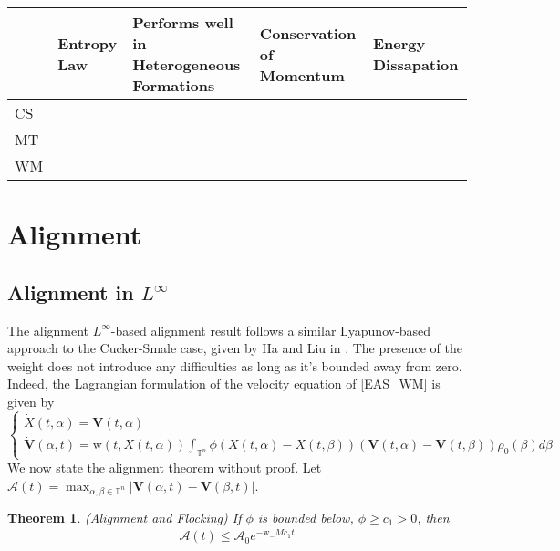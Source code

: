 \documentclass[11pt,letterpaper]{amsart}
\theoremstyle{plain}
\newtheorem{theorem}[THEOREM]{Theorem}
\theoremstyle{definition}
\theoremstyle{remark}
\newcommand{\T}{\ensuremath{\mathbb{T}}}   %
\def \cA {\mathcal{A}}
\renewcommand{\geq}{\geqslant}
\renewcommand{\leq}{\leqslant}
\newcommand{\cmark}{\ding{51}}%
\newcommand{\xmark}{\ding{55}}%
\def\T{\mathbb{T}}
\def\V{\textbf{V}}
\def \wt {\mathrm{w}}
\begin{document}
\medskip
\begin{tabular}
    { | m{3em} | m{6em}| m{8em} | m{7em} | m{9em} | } 
    \hline 
       & Entropy Law & Performs well in Heterogeneous Formations & Conservation of Momentum & Energy Dissapation \\
    \hline
    CS & \cmark & \xmark & \cmark & \cmark\\ 
    \hline
    MT & \xmark & \cmark & \xmark & \xmark \\ 
    \hline
    WM & \cmark & \cmark & \xmark & \xmark \\ 
    \hline
\end{tabular}
\label{table:compare_models}

 








\section{Alignment} 
\label{alignment}

\subsection{Alignment in $L^{\infty}$}
\label{linf_alignment}
The alignment $L^{\infty}$-based alignment result follows a similar Lyapunov-based approach 
to the Cucker-Smale case, given by Ha and Liu in \cite{HL2009}.  The presence of the weight does not introduce any difficulties as long as it's bounded 
away from zero. Indeed, the Lagrangian formulation of the velocity equation of \eqref{EAS_WM} is given by 
\begin{equation*}
    \begin{cases}
        \dot{X}(t, \alpha) = \V(t, \alpha) \\
        \dot{\V}(\alpha, t) = \wt(t, X(t,\alpha)) \int_{\T^n} \phi(X(t, \alpha) - X(t, \beta)) (\V(t,\alpha) - \V(t, \beta)) \rho_0(\beta) d\beta
    \end{cases}
\end{equation*}
We now state the alignment theorem without proof.
Let $\mathcal{A}(t) = \max_{\alpha, \beta \in \T^n} |\V(\alpha,t) - \V(\beta,t)|$.
\begin{theorem} {(Alignment and Flocking)}
    \label{thm:linf_alignment}
    If $\phi$ is bounded below, $\phi \geq c_1 > 0$, then
    \begin{align*}
        \mathcal{A}(t) \leq \cA_0 e^{-\wt_- M c_1 t}
    \end{align*}  
\end{theorem}
\end{document}

